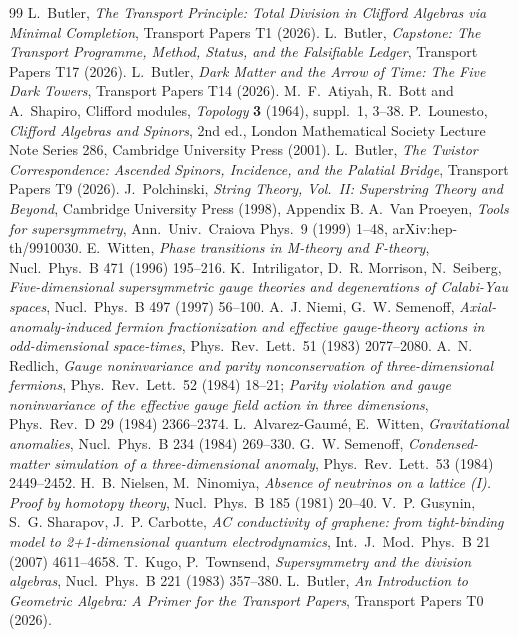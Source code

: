 \documentclass[11pt]{article}
\theoremstyle{definition}
\theoremstyle{plain}
\begin{document}
\begin{thebibliography}{99}
 L.~Butler,
\emph{The Transport Principle: Total Division in Clifford Algebras via Minimal Completion},
Transport Papers T1 (2026).
 L.~Butler,
\emph{Capstone: The Transport Programme, Method, Status, and the Falsifiable Ledger},
Transport Papers T17 (2026).
 L.~Butler,
\emph{Dark Matter and the Arrow of Time: The Five Dark Towers},
Transport Papers T14 (2026).
 M.~F.~Atiyah, R.~Bott and A.~Shapiro,
Clifford modules,
\emph{Topology} \textbf{3} (1964), suppl.~1, 3--38.
 P.~Lounesto,
\emph{Clifford Algebras and Spinors}, 2nd ed.,
London Mathematical Society Lecture Note Series 286, Cambridge University Press (2001).
 L.~Butler,
\emph{The Twistor Correspondence: Ascended Spinors, Incidence, and the Palatial Bridge},
Transport Papers T9 (2026).
 J.~Polchinski,
\emph{String Theory, Vol.~II: Superstring Theory and Beyond},
Cambridge University Press (1998), Appendix B.
 A.~Van Proeyen,
\emph{Tools for supersymmetry},
Ann.\ Univ.\ Craiova Phys.\ 9 (1999) 1--48, arXiv:hep-th/9910030.
 E.~Witten,
\emph{Phase transitions in M-theory and F-theory},
Nucl.\ Phys.\ B 471 (1996) 195--216.
 K.~Intriligator, D.~R. Morrison, N.~Seiberg,
\emph{Five-dimensional supersymmetric gauge theories and degenerations of Calabi-Yau spaces},
Nucl.\ Phys.\ B 497 (1997) 56--100.
 A.~J. Niemi, G.~W. Semenoff,
\emph{Axial-anomaly-induced fermion fractionization and effective gauge-theory actions in odd-dimensional space-times},
Phys.\ Rev.\ Lett.\ 51 (1983) 2077--2080.
 A.~N. Redlich,
\emph{Gauge noninvariance and parity nonconservation of three-dimensional fermions},
Phys.\ Rev.\ Lett.\ 52 (1984) 18--21; \emph{Parity violation and gauge noninvariance of the effective gauge field action in three dimensions}, Phys.\ Rev.\ D 29 (1984) 2366--2374.
 L.~Alvarez-Gaum\'e, E.~Witten,
\emph{Gravitational anomalies},
Nucl.\ Phys.\ B 234 (1984) 269--330.
 G.~W. Semenoff,
\emph{Condensed-matter simulation of a three-dimensional anomaly},
Phys.\ Rev.\ Lett.\ 53 (1984) 2449--2452.
 H.~B. Nielsen, M.~Ninomiya,
\emph{Absence of neutrinos on a lattice (I). Proof by homotopy theory},
Nucl.\ Phys.\ B 185 (1981) 20--40.
 V.~P. Gusynin, S.~G. Sharapov, J.~P. Carbotte,
\emph{AC conductivity of graphene: from tight-binding model to 2+1-dimensional quantum electrodynamics},
Int.\ J.\ Mod.\ Phys.\ B 21 (2007) 4611--4658.
 T.~Kugo, P.~Townsend,
\emph{Supersymmetry and the division algebras},
Nucl.\ Phys.\ B 221 (1983) 357--380.
 L.~Butler,
\emph{An Introduction to Geometric Algebra: A Primer for the Transport Papers},
Transport Papers T0 (2026).
\end{thebibliography}
\end{document}
